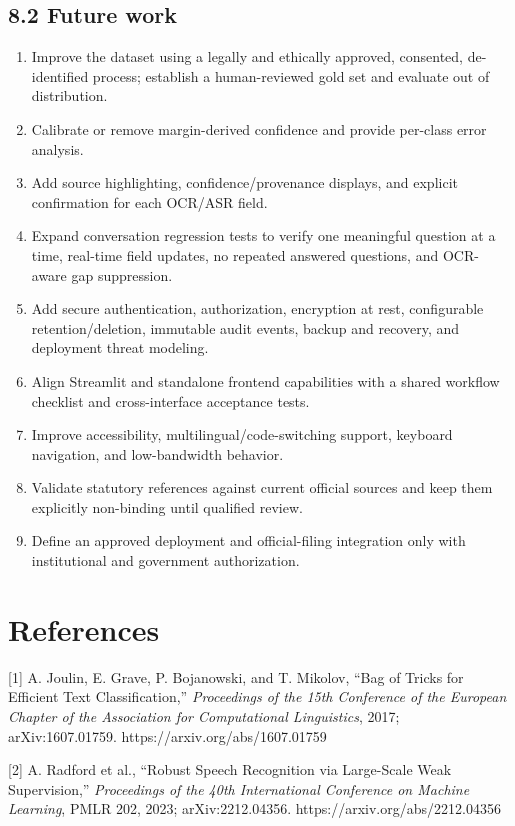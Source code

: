 \documentclass[12pt,a4paper,oneside]{report}
\begin{document}
\section{8.2 Future work}
\begin{enumerate}
\item Improve the dataset using a legally and ethically approved, consented, de-identified process; establish a human-reviewed gold set and evaluate out of distribution.
\item Calibrate or remove margin-derived confidence and provide per-class error analysis.
\item Add source highlighting, confidence/provenance displays, and explicit confirmation for each OCR/ASR field.
\item Expand conversation regression tests to verify one meaningful question at a time, real-time field updates, no repeated answered questions, and OCR-aware gap suppression.
\item Add secure authentication, authorization, encryption at rest, configurable retention/deletion, immutable audit events, backup and recovery, and deployment threat modeling.
\item Align Streamlit and standalone frontend capabilities with a shared workflow checklist and cross-interface acceptance tests.
\item Improve accessibility, multilingual/code-switching support, keyboard navigation, and low-bandwidth behavior.
\item Validate statutory references against current official sources and keep them explicitly non-binding until qualified review.
\item Define an approved deployment and official-filing integration only with institutional and government authorization.
\end{enumerate}
\clearpage\chapter*{References}
[1] A. Joulin, E. Grave, P. Bojanowski, and T. Mikolov, ``Bag of Tricks for Efficient Text Classification,'' \emph{Proceedings of the 15th Conference of the European Chapter of the Association for Computational Linguistics}, 2017; arXiv:1607.01759. https://arxiv.org/abs/1607.01759

[2] A. Radford et al., ``Robust Speech Recognition via Large-Scale Weak Supervision,'' \emph{Proceedings of the 40th International Conference on Machine Learning}, PMLR 202, 2023; arXiv:2212.04356. https://arxiv.org/abs/2212.04356
\end{document}
